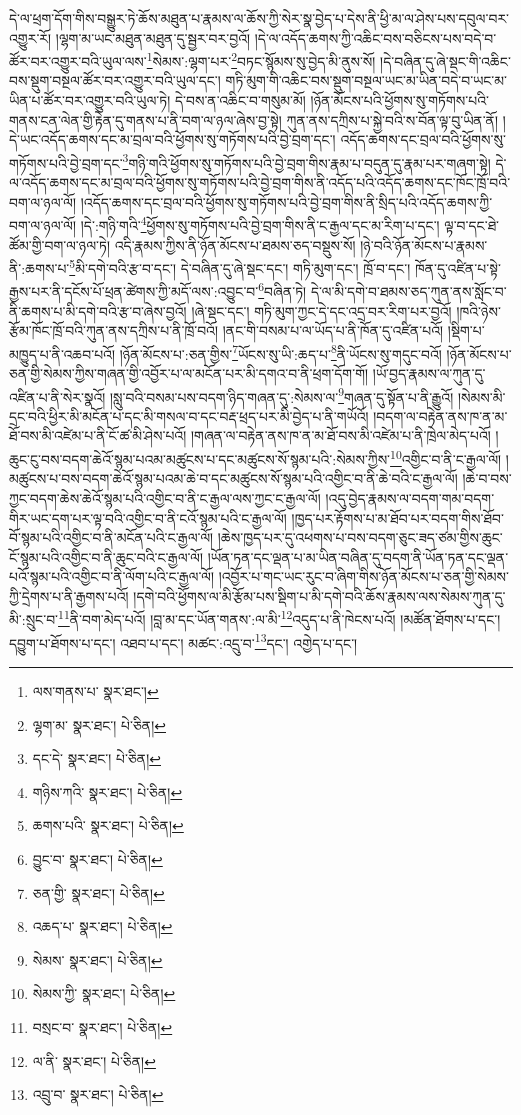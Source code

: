 དེ་ལ་ཕྲག་དོག་གིས་བསྒྱུར་ཏེ་ཆོས་མཐུན་པ་རྣམས་ལ་ཆོས་ཀྱི་སེར་སྣ་བྱེད་པ་དེས་ནི་ཕྱི་མ་ལ་ཤེས་པས་དབུལ་བར་འགྱུར་རོ། །ལྷག་མ་ཡང་མཐུན་མཐུན་དུ་སྦྱར་བར་བྱའོ། །དེ་ལ་འདོད་ཆགས་ཀྱི་འཆིང་བས་བཅིངས་པས་བདེ་བ་ཚོར་བར་འགྱུར་བའི་ཡུལ་ལས་\footnote{ལས་གནས་པ་  སྣར་ཐང་། }སེམས་:ལྷག་པར་\footnote{ལྷག་མ་  སྣར་ཐང་།  པེ་ཅིན། }བཏང་སྙོམས་སུ་བྱེད་མི་ནུས་སོ། །དེ་བཞིན་དུ་ཞེ་སྡང་གི་འཆིང་བས་སྡུག་བསྔལ་ཚོར་བར་འགྱུར་བའི་ཡུལ་དང་། གཏི་མུག་གི་འཆིང་བས་སྡུག་བསྔལ་ཡང་མ་ཡིན་བདེ་བ་ཡང་མ་ཡིན་པ་ཚོར་བར་འགྱུར་བའི་ཡུལ་ཏེ། དེ་བས་ན་འཆིང་བ་གསུམ་མོ། །ཉོན་མོངས་པའི་ཕྱོགས་སུ་གཏོགས་པའི་གནས་ངན་ལེན་གྱི་རྟེན་དུ་གནས་པ་ནི་བག་ལ་ཉལ་ཞེས་བྱ་སྟེ། ཀུན་ནས་དཀྲིས་པ་སྐྱེ་བའི་ས་བོན་ལྟ་བུ་ཡིན་ནོ། །དེ་ཡང་འདོད་ཆགས་དང་མ་བྲལ་བའི་ཕྱོགས་སུ་གཏོགས་པའི་བྱེ་བྲག་དང་། འདོད་ཆགས་དང་བྲལ་བའི་ཕྱོགས་སུ་གཏོགས་པའི་བྱེ་བྲག་དང་\footnote{དང་དེ་  སྣར་ཐང་།  པེ་ཅིན། }གཉི་གའི་ཕྱོགས་སུ་གཏོགས་པའི་བྱེ་བྲག་གིས་རྣམ་པ་བདུན་དུ་རྣམ་པར་གཞག་སྟེ། དེ་ལ་འདོད་ཆགས་དང་མ་བྲལ་བའི་ཕྱོགས་སུ་གཏོགས་པའི་བྱེ་བྲག་གིས་ནི་འདོད་པའི་འདོད་ཆགས་དང་ཁོང་ཁྲོ་བའི་བག་ལ་ཉལ་ལོ། །འདོད་ཆགས་དང་བྲལ་བའི་ཕྱོགས་སུ་གཏོགས་པའི་བྱེ་བྲག་གིས་ནི་སྲིད་པའི་འདོད་ཆགས་ཀྱི་བག་ལ་ཉལ་ལོ། །དེ་:གཉི་གའི་\footnote{གཉིས་ཀའི་  སྣར་ཐང་།  པེ་ཅིན། }ཕྱོགས་སུ་གཏོགས་པའི་བྱེ་བྲག་གིས་ནི་ང་རྒྱལ་དང་མ་རིག་པ་དང་། ལྟ་བ་དང་ཐེ་ཚོམ་གྱི་བག་ལ་ཉལ་ཏེ། འདི་རྣམས་ཀྱིས་ནི་ཉོན་མོངས་པ་ཐམས་ཅད་བསྡུས་སོ། །ཉེ་བའི་ཉོན་མོངས་པ་རྣམས་ནི་:ཆགས་པ་\footnote{ཆགས་པའི་  སྣར་ཐང་།  པེ་ཅིན། }མི་དགེ་བའི་རྩ་བ་དང་། དེ་བཞིན་དུ་ཞེ་སྡང་དང་། གཏི་མུག་དང་། ཁྲོ་བ་དང་། ཁོན་དུ་འཛིན་པ་སྟེ་རྒྱས་པར་ནི་དངོས་པོ་ཕྲན་ཚེགས་ཀྱི་མདོ་ལས་:འབྱུང་བ་\footnote{བྱུང་བ་  སྣར་ཐང་།  པེ་ཅིན། }བཞིན་ཏེ། དེ་ལ་མི་དགེ་བ་ཐམས་ཅད་ཀུན་ནས་སློང་བ་ནི་ཆགས་པ་མི་དགེ་བའི་རྩ་བ་ཞེས་བྱའོ། །ཞེ་སྡང་དང་། གཏི་མུག་ཀྱང་དེ་དང་འདྲ་བར་རིག་པར་བྱའོ། །ཁའི་ཉེས་རྩོམ་ཁོང་ཁྲོ་བའི་ཀུན་ནས་དཀྲིས་པ་ནི་ཁྲོ་བའོ། །ནང་གི་བསམ་པ་ལ་ཡོད་པ་ནི་ཁོན་དུ་འཛིན་པའོ། །སྡིག་པ་མཁྱུད་པ་ནི་འཆབ་པའོ། །ཉོན་མོངས་པ་:ཅན་གྱིས་\footnote{ཅན་གྱི་  སྣར་ཐང་།  པེ་ཅིན། }ཡོངས་སུ་ཡི་:ཆད་པ་\footnote{འཆད་པ་  སྣར་ཐང་།  པེ་ཅིན། }ནི་ཡོངས་སུ་གདུང་བའོ། །ཉོན་མོངས་པ་ཅན་གྱི་སེམས་ཀྱིས་གཞན་གྱི་འབྱོར་པ་ལ་མངོན་པར་མི་དགའ་བ་ནི་ཕྲག་དོག་གོ། །ཡོ་བྱད་རྣམས་ལ་ཀུན་དུ་འཛིན་པ་ནི་སེར་སྣའོ། །སླུ་བའི་བསམ་པས་བདག་ཉིད་གཞན་དུ་:སེམས་ལ་\footnote{སེམས་  སྣར་ཐང་།  པེ་ཅིན། }གཞན་དུ་སྟོན་པ་ནི་རྒྱུའོ། །སེམས་མི་དྲང་བའི་ཕྱིར་མི་མངོན་པ་དང་མི་གསལ་བ་དང་བརྡ་ཕྲད་པར་མི་བྱེད་པ་ནི་གཡོའོ། །བདག་ལ་བརྟེན་ནས་ཁ་ན་མ་ཐོ་བས་མི་འཛེམ་པ་ནི་ངོ་ཚ་མི་ཤེས་པའོ། །གཞན་ལ་བརྟེན་ནས་ཁ་ན་མ་ཐོ་བས་མི་འཛེམ་པ་ནི་ཁྲེལ་མེད་པའོ། །ཆུང་ངུ་བས་བདག་ཆེའོ་སྙམ་པའམ་མཚུངས་པ་དང་མཚུངས་སོ་སྙམ་པའི་:སེམས་ཀྱིས་\footnote{སེམས་ཀྱི་  སྣར་ཐང་།  པེ་ཅིན། }འགྱིང་བ་ནི་ང་རྒྱལ་ལོ། །མཚུངས་པ་བས་བདག་ཆེའོ་སྙམ་པའམ་ཆེ་བ་དང་མཚུངས་སོ་སྙམ་པའི་འགྱིང་བ་ནི་ཆེ་བའི་ང་རྒྱལ་ལོ། །ཆེ་བ་བས་ཀྱང་བདག་ཆེས་ཆེའོ་སྙམ་པའི་འགྱིང་བ་ནི་ང་རྒྱལ་ལས་ཀྱང་ང་རྒྱལ་ལོ། །འདུ་བྱེད་རྣམས་ལ་བདག་གམ་བདག་གིར་ཡང་དག་པར་ལྟ་བའི་འགྱིང་བ་ནི་ངའོ་སྙམ་པའི་ང་རྒྱལ་ལོ། །ཁྱད་པར་རྟོགས་པ་མ་ཐོབ་པར་བདག་གིས་ཐོབ་བོ་སྙམ་པའི་འགྱིང་བ་ནི་མངོན་པའི་ང་རྒྱལ་ལོ། །ཆེས་ཁྱད་པར་དུ་འཕགས་པ་བས་བདག་ཅུང་ཟད་ཙམ་གྱིས་ཆུང་ངོ་སྙམ་པའི་འགྱིང་བ་ནི་ཆུང་བའི་ང་རྒྱལ་ལོ། །ཡོན་ཏན་དང་ལྡན་པ་མ་ཡིན་བཞིན་དུ་བདག་ནི་ཡོན་ཏན་དང་ལྡན་པའོ་སྙམ་པའི་འགྱིང་བ་ནི་ལོག་པའི་ང་རྒྱལ་ལོ། །འབྱོར་པ་གང་ཡང་རུང་བ་ཞིག་གིས་ཉོན་མོངས་པ་ཅན་གྱི་སེམས་ཀྱི་དྲེགས་པ་ནི་རྒྱགས་པའོ། །དགེ་བའི་ཕྱོགས་ལ་མི་རྩོམ་པས་སྡིག་པ་མི་དགེ་བའི་ཆོས་རྣམས་ལས་སེམས་ཀུན་དུ་མི་:སྲུང་བ་\footnote{བསྲང་བ་  སྣར་ཐང་།  པེ་ཅིན། }ནི་བག་མེད་པའོ། །བླ་མ་དང་ཡོན་གནས་:ལ་མི་\footnote{ལ་ནི་  སྣར་ཐང་།  པེ་ཅིན། }འདུད་པ་ནི་ཁེངས་པའོ། །མཚོན་ཐོགས་པ་དང་། དབྱུག་པ་ཐོགས་པ་དང་། འཐབ་པ་དང་། མཚང་:འདྲུ་བ་\footnote{འབྲུ་བ་  སྣར་ཐང་།  པེ་ཅིན། }དང་། འགྱེད་པ་དང་། 